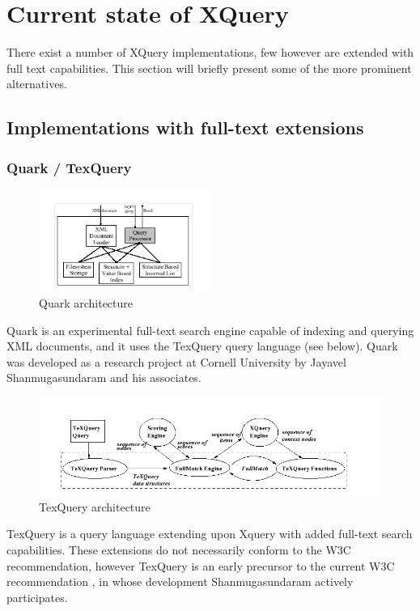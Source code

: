 \section{Current state of XQuery}
There exist a number of XQuery implementations, few however are extended with full text capabilities. This section will briefly present some of the more prominent alternatives.
\subsection{Implementations with full-text extensions}
\subsubsection{Quark / TexQuery}
\begin{figure}[!h]
  \centering
    \includegraphics[width=0.5\textwidth]{img/quark_architecture.png}
  \caption{Quark architecture}
\end{figure}
Quark is an experimental full-text search engine capable of indexing and querying XML documents, and it uses the TexQuery query language (see below). Quark was developed as a research project at Cornell University by Jayavel Shanmugasundaram and his associates.
\begin{figure}[!h]
  \centering
    \includegraphics[width=1\textwidth]{img/texquery_architecture.png}
  \caption{TexQuery architecture}
\end{figure}
TexQuery is a query language extending upon Xquery with added full-text search capabilities. These extensions do not necessarily conform to the W3C recommendation, however TexQuery is an early precursor to the current W3C recommendation \cite{TEXQ00}, in whose development Shanmugasundaram actively participates.

